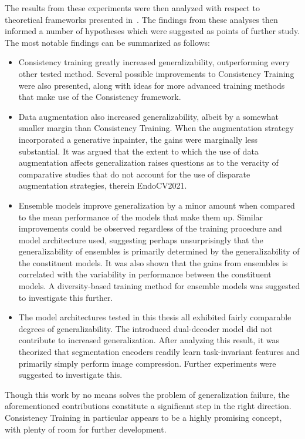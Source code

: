     The results from these experiments were then analyzed with respect to theoretical frameworks presented in~. The findings from these analyses then informed a number of hypotheses which were suggested as points of further study. The most notable findings can be summarized as follows:
    \begin{itemize}
        \item Consistency training greatly increased generalizability, outperforming every other tested method. Several possible improvements to Consistency Training were also presented, along with ideas for more advanced training methods that make use of the Consistency framework.
        
        \item Data augmentation also increased generalizability, albeit by a somewhat smaller margin than Consistency Training. When the augmentation strategy incorporated a generative inpainter, the gains were marginally less substantial. It was argued that the extent to which the use of data augmentation affects generalization raises questions as to the veracity of comparative studies that do not account for the use of disparate augmentation strategies, therein EndoCV2021.

        \item Ensemble models improve generalization by a minor amount when compared to the mean performance of the models that make them up. Similar improvements could be observed regardless of the training procedure and model architecture used, suggesting perhaps unsurprisingly that the generalizability of ensembles is primarily determined by the generalizability of the constituent models. It was also shown that the gains from ensembles is correlated with the variability in performance between the constituent models. A diversity-based training method for ensemble models was suggested to investigate this further.
        
        \item The model architectures tested in this thesis all exhibited fairly comparable degrees of generalizability. The introduced dual-decoder model did not contribute to increased generalization. After analyzing this result, it was theorized that segmentation encoders readily learn task-invariant features and primarily simply perform image compression. Further experiments were suggested to investigate this.  
    \end{itemize}

    Though this work by no means solves the problem of generalization failure, the aforementioned contributions constitute a significant step in the right direction. Consistency Training in particular appears to be a highly promising concept, with plenty of room for further development. 
    
